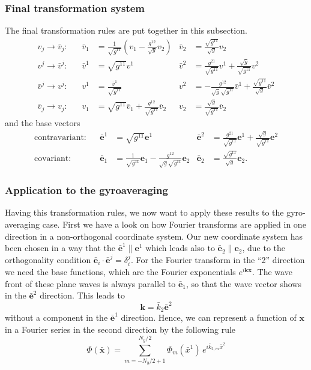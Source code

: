 \subsubsection{Final transformation system}
The final transformation rules are put together in this subsection.
\begin{align*}
  v_j\rightarrow\bar v_j: && \bar v_1 &= \frac{1}{\sqrt{g^{11}}}\left(
    v_1 
    -\frac{g^{12}}{\sqrt{g}} v_2
  \right) &
  \bar v_2 &= \frac{\sqrt{g^{11}}}{\sqrt{g}}v_2\\
  v^j\rightarrow \bar v^j: && \bar v^1 &= \sqrt{g^{11}} v^1 &
  \bar v^2 &= \frac{g^{21}}{\sqrt{g^{11}}} v^1 
  +\frac{\sqrt{g}}{\sqrt{g^{11}}} v^2\\
  \bar v^j\rightarrow v^j: &&
  v^1 &= \frac{\bar v^1}{\sqrt{g^{11}}} &
  v^2 &= -\frac{g^{12}}{\sqrt{g}\sqrt{g^{11}}}\bar v^1
  +\frac{\sqrt{g^{11}}}{\sqrt{g}}\bar v^2\\
  \bar v_j\rightarrow v_j: && 
  v_1 &= \sqrt{g^{11}}\bar v_1
  +\frac{g^{12}}{\sqrt{g^{11}}}\bar v_2 &
  v_2 &= \frac{\sqrt{g}}{\sqrt{g^{11}}}\bar v_2
\end{align*}
and the base vectors
\begin{align*}
  \mbox{contravariant:} && \mathbf{\bar e}^1 &= \sqrt{g^{11}}\mathbf{e}^1 &
  \mathbf{\bar e}^2 &= \frac{g^{21}}{\sqrt{g^{11}}}\mathbf{e}^1
  +\frac{\sqrt{g}}{\sqrt{g^{11}}}\mathbf{e}^2\\
  \mbox{covariant:} && \mathbf{\bar e}_1 &= \frac{1}{\sqrt{g^{11}}}\mathbf{e}_1
  -\frac{g^{12}}{\sqrt{g}\sqrt{g^{11}}}\mathbf{e}_2 &
  \mathbf{\bar e}_2 &= \frac{\sqrt{g^{11}}}{\sqrt{g}}\mathbf{e}_2.
\end{align*}

\subsubsection{Application to the gyroaveraging}
Having this transformation rules, we now want to apply these results
to the gyro-averaging case. First we have a look on how Fourier
transforms are applied in one direction in a non-orthogonal coordinate
system. Our new coordinate system has been chosen in a way that the
$\bar{\mathbf{e}}^1 \| \mathbf{e}^1$ which leads also to
$\bar{\mathbf{e}}_2\|\mathbf{e}_2$, due to the orthogonality condition
$\bar{\mathbf{e}}_i\cdot\bar{\mathbf{e}}^j=
\delta_i^j$. For the Fourier transform in the ``2'' direction we need
the base functions, which are the Fourier exponentials
$e^{i\mathbf{k}\mathbf{x}}$. The wave front of these plane waves is
always parallel to $\bar{\mathbf{e}}_1$, so that the wave vector shows
in the $\bar{\mathbf{e}}^2$ direction. This leads to 
\begin{displaymath}
  \mathbf{k}=\bar{k}_2\bar{\mathbf{e}}^2
\end{displaymath}
without a component in the $\bar{\mathbf{e}}^1$ direction. 
Hence, we can represent a function of $\mathbf{x}$ in a Fourier series
in the second direction by the following rule
\begin{displaymath}
  \Phi(\bar{\mathbf{x}})=\sum_{m=-N_y/2+1}^{N_y/2}\Phi_m(\bar{x}^1)\,e^{i\bar{k}_{2,m}\bar{x}^2}
\end{displaymath}

